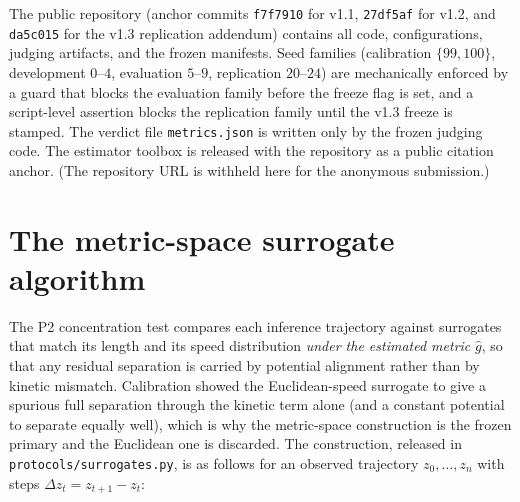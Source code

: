 \documentclass{article}
\begin{document}
The public repository (anchor commits \texttt{f7f7910} for v1.1, \texttt{27df5af}
for v1.2, and \texttt{da5c015} for the v1.3 replication addendum) contains all
code, configurations, judging artifacts, and the frozen manifests. Seed families
(calibration $\{99,100\}$, development $0$--$4$, evaluation $5$--$9$, replication
$20$--$24$) are mechanically enforced by a guard that blocks the evaluation family
before the freeze flag is set, and a script-level assertion blocks the replication
family until the v1.3 freeze is stamped. The verdict file
\texttt{metrics.json} is written only by the frozen judging code. The estimator
toolbox is released with the repository as a public citation anchor. (The
repository URL is withheld here for the anonymous submission.)

\appendix

\section{The metric-space surrogate algorithm}
\label{app:surrogate}

The P2 concentration test compares each inference trajectory against surrogates
that match its length and its speed distribution \emph{under the estimated metric}
$\hat g$, so that any residual separation is carried by potential alignment rather
than by kinetic mismatch. Calibration showed the Euclidean-speed surrogate to give
a spurious full separation through the kinetic term alone (and a constant potential
to separate equally well), which is why the metric-space construction is the frozen
primary and the Euclidean one is discarded. The construction, released in
\texttt{protocols/surrogates.py}, is as follows for an observed trajectory
$z_0,\dots,z_n$ with steps $\Delta z_t = z_{t+1}-z_t$:
\end{document}
